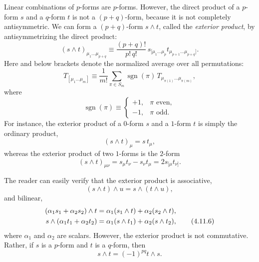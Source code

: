 Linear combinations of \(p\)-forms are \(p\)-forms. However, the direct
product of a \(p\)-form \(s\) and a \(q\)-form \(t\) is not a
\((p+q)\)-form, because it is not completely antisymmetric. We can form a
\((p+q)\)-form \(s\wedge t\), called the \textit{exterior product}, by
antisymmetrizing the direct product:
\begin{equation}
  (s\wedge t)_{\mu_1\ldots\mu_{p+q}}
  \equiv
  \frac{(p+q)!}{p!\,q!}\,
  s_{[\mu_1\ldots\mu_p}
  t_{\mu_{p+1}\ldots\mu_{p+q}]}.
  \tag{4.11.2}\label{eq:4.11.2}
\end{equation}
Here and below brackets denote the normalized average over all permutations:
\begin{equation}
  T_{[\mu_1\ldots\mu_m]}
  \equiv
  \frac{1}{m!}
  \sum_{\pi\in S_m}
  \operatorname{sgn}(\pi)\,
  T_{\mu_{\pi(1)}\ldots\mu_{\pi(m)}} ,
  \tag{4.11.3}\label{eq:4.11.3}
\end{equation}
where
\begin{equation}
  \operatorname{sgn}(\pi)
  \equiv
  \begin{cases}
    +1,&\pi\text{ even},\\
    -1,&\pi\text{ odd}.
  \end{cases}
  \tag{4.11.4}\label{eq:4.11.4}
\end{equation}
For instance, the exterior product of a \(0\)-form \(s\) and a \(1\)-form
\(t\) is simply the ordinary product,
\[
  (s\wedge t)_\mu=s\,t_\mu,
\]
whereas the exterior product of two \(1\)-forms is the \(2\)-form
\[
  (s\wedge t)_{\mu\nu}
  =
  s_\mu t_\nu-s_\nu t_\mu
  =
  2s_{[\mu}t_{\nu]}.
\]

The reader can easily verify that the exterior product is associative,
\begin{equation}
  (s\wedge t)\wedge u=s\wedge(t\wedge u),
  \tag{4.11.5}\label{eq:4.11.5}
\end{equation}
and bilinear,
\begin{align}
  (\alpha_1s_1+\alpha_2s_2)\wedge t
  &=
  \alpha_1(s_1\wedge t)+\alpha_2(s_2\wedge t),
  \notag\\
  s\wedge(\alpha_1t_1+\alpha_2t_2)
  &=
  \alpha_1(s\wedge t_1)+\alpha_2(s\wedge t_2),
  \tag{4.11.6}\label{eq:4.11.6}
\end{align}
where \(\alpha_1\) and \(\alpha_2\) are scalars. However, the exterior
product is not commutative. Rather, if \(s\) is a \(p\)-form and \(t\) is a
\(q\)-form, then
\begin{equation}
  s\wedge t=(-1)^{pq}t\wedge s.
  \tag{4.11.7}\label{eq:4.11.7}
\end{equation}


